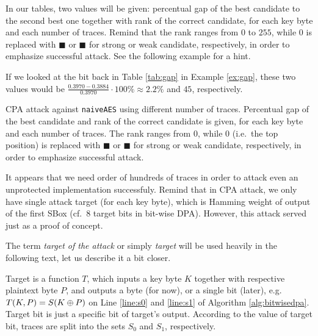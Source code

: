 	\begin{note}
	\label{note:tabvals}
		In our tables, two values will be given: percentual gap of the best candidate to the second best one together with rank of the correct candidate, for each key byte and each number of traces. Remind that the rank ranges from $0$ to $255$, while $0$ is replaced with $\blacksquare$ or {\weak$\blacksquare$} for strong or weak candidate, respectively, in order to emphasize successful attack. See the following example for a hint.
	\end{note}
	
	\begin{example}
	\label{ex:gaprank}
		If we looked at the  bit back in Table \ref{tab:gap} in Example \ref{ex:gap}, these two values would be $\frac{0.3970-0.3884}{0.3970}\cdot100\%\approx2.2\%$ and $45$, respectively.
	\end{example}
	
	\begin{table}[h]
		\begin{center}
		
		\end{center}
	\caption{CPA attack against {\tt naiveAES} using different number of traces. Percentual gap of the best candidate and rank of the correct candidate is given, for each key byte and each number of traces. The rank ranges from $0$, while $0$ (i.e.\ the top position) is replaced with $\blacksquare$ or {\weak$\blacksquare$} for strong or weak candidate, respectively, in order to emphasize successful attack.}
	\label{tab:naiveaescpa}
	\end{table}
	
	It appears that we need order of hundreds of traces in order to attack even an unprotected implementation successfuly. Remind that in CPA attack, we only have single attack target (for each key byte), which is Hamming weight of output of the first SBox (cf.\ $8$ target bits in bit-wise DPA). However, this attack served just as a proof of concept.
	
	\begin{note}
	\label{note:target}
		The term {\em target of the attack} or simply {\em target} will be used heavily in the following text, let us describe it a bit closer.
		
		Target is a function $T$, which inputs a key byte $K$ together with respective plaintext byte $P$, and outputs a byte (for now), or a single bit (later), e.g.\ $T(K,P) = S(K\oplus P)$ on Line \ref{line:s0} and \ref{line:s1} of Algorithm \ref{alg:bitwisedpa}. Target bit is just a specific bit of target's output. According to the value of target bit, traces are split into the sets $S_0$ and $S_1$, respectively.
	\end{note}

